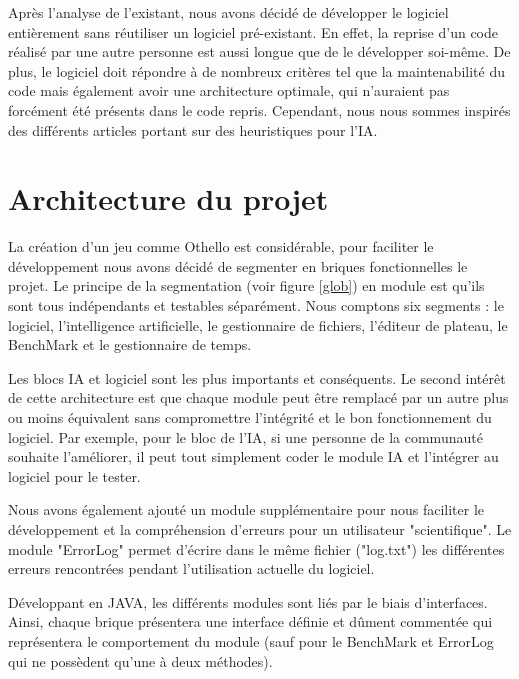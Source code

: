 Après l'analyse de l'existant, nous avons décidé de développer le logiciel entièrement sans réutiliser un logiciel pré-existant. En effet, la reprise d'un code réalisé par une autre personne est aussi longue que de le développer soi-même. De plus, le logiciel doit répondre à de nombreux critères tel que la maintenabilité du code mais également avoir une architecture optimale, qui n'auraient pas forcément été présents dans le code repris. Cependant, nous nous sommes inspirés des différents articles portant sur des heuristiques pour l'IA.

\section{Architecture du projet}

La création d'un jeu comme Othello est considérable, pour faciliter le développement nous avons décidé de segmenter en briques fonctionnelles le projet. Le principe de la segmentation (voir figure \ref{glob}) en module est qu’ils sont tous indépendants et testables séparément. Nous comptons six segments : le logiciel, l'intelligence artificielle, le gestionnaire de fichiers, l'éditeur de plateau, le BenchMark et le gestionnaire de temps.

Les blocs IA et logiciel sont les plus importants et conséquents. Le second intérêt de cette architecture est que chaque module peut être remplacé par un autre plus ou moins équivalent sans compromettre l’intégrité et le bon fonctionnement du logiciel. Par exemple, pour le bloc de l’IA, si une personne de la communauté souhaite l’améliorer, il peut tout simplement coder le module IA et l’intégrer au logiciel pour le tester.

Nous avons également ajouté un module supplémentaire pour nous faciliter le développement et la compréhension d'erreurs pour un utilisateur "scientifique". Le module "ErrorLog" permet d'écrire dans le même fichier ("log.txt") les différentes erreurs rencontrées pendant l'utilisation actuelle du logiciel.

Développant en JAVA, les différents modules sont liés par le biais d’interfaces. Ainsi, chaque brique présentera une interface définie et dûment commentée qui représentera le comportement du module (sauf pour le BenchMark et ErrorLog qui ne possèdent qu'une à deux méthodes).


